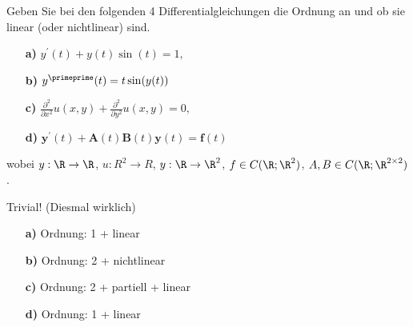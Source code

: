 \begin{exercise}

Geben Sie bei den folgenden 4 Differentialgleichungen die Ordnung an und ob sie linear (oder nichtlinear)
sind.

\begin{itemize}
  \item[\textbf{a)}] $y^\prime(t) + y(t) \sin(t)  = 1,$
  \item[\textbf{b)}] $y^\primeprime(t)  = t \sin(y(t))$
  \item[\textbf{c)}] $\frac{\partial^2}{\partial x^2} u(x, y) + \frac{\partial^2}{\partial y^2} u(x, y)  = 0,$
  \item[\textbf{d)}] $\mathbf{y}^\prime(t) + \mathbf{A}(t) \mathbf{B}(t) \mathbf{y}(t)  = \mathbf{f}(t)$
\end{itemize}

wobei $y: \R \to \R$, $u: R^2 \to R$, $y: \R \to \R^2$, $f \in C(\R; \R^2)$, $A, B \in C(\R; \R^{2 \times 2})$.

\end{exercise}

\begin{solution}

Trivial! (Diesmal wirklich)
\begin{itemize}
  \item[\textbf{a)}] Ordnung: 1 + linear
  \item[\textbf{b)}] Ordnung: 2 + nichtlinear
  \item[\textbf{c)}] Ordnung: 2 + partiell + linear
  \item[\textbf{d)}] Ordnung: 1 + linear
\end{itemize}

\end{solution}
